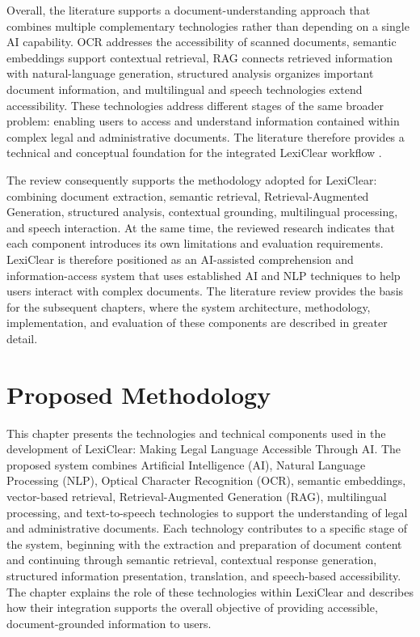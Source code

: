 \documentclass[12pt,a4paper,oneside]{report}
\begin{document}
Overall, the literature supports a document-understanding approach that
combines multiple complementary technologies rather than depending on a
single AI capability. OCR addresses the accessibility of scanned documents,
semantic embeddings support contextual retrieval, RAG connects retrieved
information with natural-language generation, structured analysis organizes
important document information, and multilingual and speech technologies
extend accessibility. These technologies address different stages of the
same broader problem: enabling users to access and understand information
contained within complex legal and administrative documents. The literature
therefore provides a technical and conceptual foundation for the integrated
LexiClear workflow
\cite{pramanik2025,lewis2020rag,ash2024translating}.

The review consequently supports the methodology adopted for LexiClear:
combining document extraction, semantic retrieval, Retrieval-Augmented
Generation, structured analysis, contextual grounding, multilingual
processing, and speech interaction. At the same time, the reviewed research
indicates that each component introduces its own limitations and evaluation
requirements. LexiClear is therefore positioned as an AI-assisted
comprehension and information-access system that uses established AI and NLP
techniques to help users interact with complex documents. The literature
review provides the basis for the subsequent chapters, where the system
architecture, methodology, implementation, and evaluation of these
components are described in greater detail.

\chapter{Proposed Methodology}

This chapter presents the technologies and technical components used in the development of LexiClear: Making Legal Language Accessible Through AI. The proposed system combines Artificial Intelligence (AI), Natural Language Processing (NLP), Optical Character Recognition (OCR), semantic embeddings, vector-based retrieval, Retrieval-Augmented Generation (RAG), multilingual processing, and text-to-speech technologies to support the understanding of legal and administrative documents. Each technology contributes to a specific stage of the system, beginning with the extraction and preparation of document content and continuing through semantic retrieval, contextual response generation, structured information presentation, translation, and speech-based accessibility. The chapter explains the role of these technologies within LexiClear and describes how their integration supports the overall objective of providing accessible, document-grounded information to users.
\end{document}
